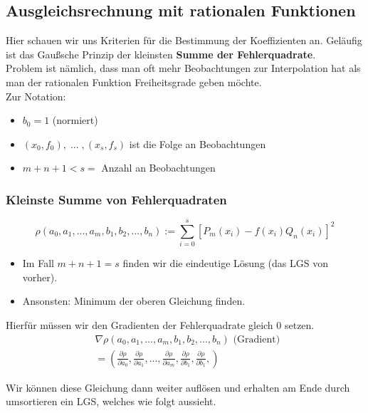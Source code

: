 \documentclass[a4paper]{article}
\begin{document}
\subsection{Ausgleichsrechnung mit rationalen Funktionen}

Hier schauen wir uns Kriterien für die Bestimmung der Koeffizienten an.
Geläufig ist das Gaußsche Prinzip der kleinsten 
\textbf{Summe der Fehlerquadrate}.
\\

Problem ist nämlich, dass man oft mehr Beobachtungen zur Interpolation
hat als man der rationalen Funktion Freiheitsgrade geben möchte.
\\

Zur Notation:
\begin{itemize}
	\item $b_0 = 1$ (normiert)
	\item $(x_0, f_0), \; ... \;, (x_s, f_s)$
		ist die Folge an Beobachtungen
	\item $m + n + 1 < s =$ Anzahl an Beobachtungen
\end{itemize}

\subsubsection{Kleinste Summe von Fehlerquadraten}

\[
\rho \left(
	a_0, a_1, ..., a_m,
	b_1, b_2, ..., b_n
\right) :=
\sum_{i=0}^{s} \left[
	P_m (x_i) - f(x_i) Q_n (x_i)
\right] ^2
\] 

\begin{itemize}
	\item Im Fall $m+n+1 = s$ finden wir die eindeutige Lösung 
		(das LGS von vorher).
	\item Ansonsten: Minimum der oberen Gleichung finden.
\end{itemize}

Hierfür müssen wir den Gradienten der Fehlerquadrate gleich $0$ setzen.
\begin{align*}
	& \nabla
		\rho \left(
			a_0, a_1, ..., a_m,
			b_1, b_2, ..., b_n
		\right) 
		\text{ (Gradient) }
		\\
	&= \left(
		\frac{ \partial \rho }{ \partial a_0 },
		\frac{ \partial \rho }{ \partial a_1 },
		...,
		\frac{ \partial \rho }{ \partial a_m },
		\frac{ \partial \rho }{ \partial b_1 },
		\frac{ \partial \rho }{ \partial b_1 },
	\right) 
\end{align*}

Wir können diese Gleichung dann weiter auflösen und erhalten am Ende durch
umsortieren ein LGS, welches wie folgt aussieht.
\end{document}
